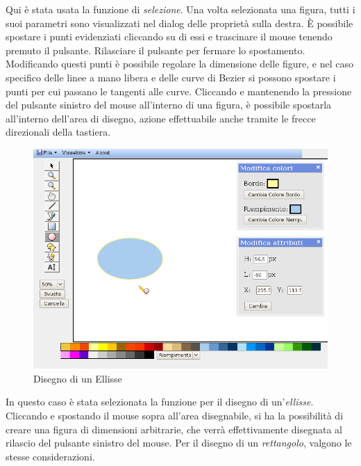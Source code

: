Qui \`e stata usata la funzione di \textit{selezione}. Una volta selezionata una figura, tutti i suoi parametri sono visualizzati nel dialog delle propriet\` a sulla destra. \`E possibile spostare i punti evidenziati cliccando su di essi e trascinare il mouse tenendo premuto il pulsante. Rilasciare il pulsante per fermare lo spostamento. Modificando questi punti \`e possibile regolare la dimensione delle figure, e nel caso specifico delle linee a mano libera e delle curve di Bezier si possono spostare i punti per cui passano le tangenti alle curve. Cliccando e mantenendo la pressione del pulsante sinistro del mouse all'interno di una figura, \`e possibile spostarla all'interno dell'area di disegno, azione effettuabile anche tramite le frecce direzionali della tastiera.

\begin{figure}[!ht]
\centering
\includegraphics[scale=0.5]{images/ellisse.png}
\caption{Disegno di un Ellisse}
\end{figure} 

\vspace{100pt}
In questo caso \`e stata selezionata la funzione per il disegno di un'\textit{ellisse}. Cliccando e spostando il mouse sopra all'area disegnabile, si ha la possibilit\` a di creare una figura di dimensioni arbitrarie, che verr\` a effettivamente disegnata al rilascio del pulsante sinistro del mouse. Per il disegno di un \textit{rettangolo}, valgono le stesse considerazioni.

